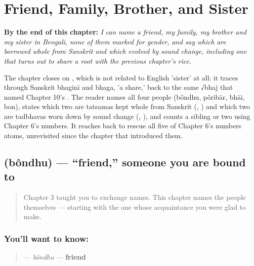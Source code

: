 
\chapter{Friend, Family, Brother, and Sister}
\label{ch:bn-friend-family-brother-sister}

\begin{chapteropening}
\textbf{By the end of this chapter:} \emph{I can name a friend, my family, my brother and my sister in Bengali, none of them marked for gender, and say which are borrowed whole from Sanskrit and which evolved by sound change, including one that turns out to share a root with the previous chapter's rice.}

The chapter closes on , which is not related to English 'sister' at all: it traces through Sanskrit bhaginī and bhaga, 'a share,' back to the same √bhaj that named Chapter 10's . The reader names all four people (bôndhu, pôribār, bhāi, bon), states which two are tatsamas kept whole from Sanskrit (, ) and which two are tadbhavas worn down by sound change (, ), and counts a sibling or two using Chapter 6's numbers. It reaches back to rescue all five of Chapter 6's numbers atoms, unrevisited since the chapter that introduced them.
\end{chapteropening}

\section[\texorpdfstring{\bn{বন্ধু} (bôndhu)}{বন্ধু (bôndhu)}]{ (bôndhu) — \textquotedblleft{}friend,\textquotedblright{} someone you are bound to}

\label{lesson:BN-C11-bondhu}



\begin{quote}
Chapter 3 taught you to exchange names. This chapter names the people themselves — starting with the one whose acquaintance you were glad to make.
\end{quote}

\subsection*{You'll want to know: }
\begin{quote}
\textbf{} — \emph{bôndhu} — \textbf{friend}
\end{quote}

